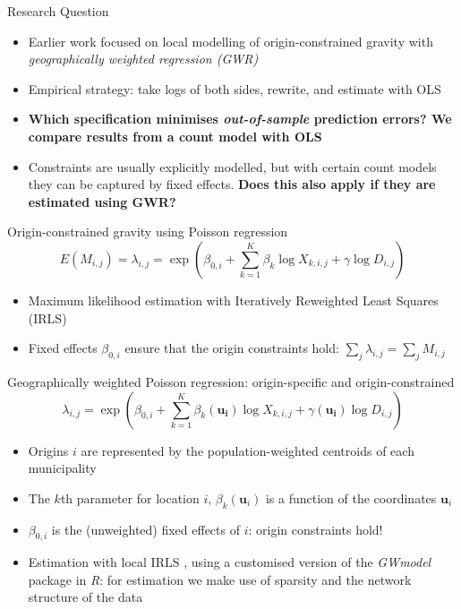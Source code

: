 \documentclass[final, 12pt, aspectratio=169, xcolor={dvipsnames}]{beamer}
\begin{document}
\begin{frame}{Research Question}
  \begin{itemize}
  \item Earlier work focused on local modelling of origin-constrained gravity with \textit{geographically weighted regression (GWR)}
  \item Empirical strategy: take logs of both sides, rewrite, and estimate with OLS 
  \item \textbf{Which specification minimises \textit{out-of-sample} prediction errors? We compare results from a count model with OLS}
  \item Constraints are usually explicitly modelled, but with certain count models they can be captured by fixed effects. \textbf{Does this also apply if they are estimated using GWR?}
  \end{itemize}
\end{frame}


\begin{frame}{Origin-constrained gravity using Poisson regression}
    $$ E(M_{i,j}) = \lambda_{i,j}  = \exp(\beta_{0, i} + \sum\limits_{k=1}^{K} \beta_{k} \log{X}_{k,i,j} + \gamma \log{D}_{i,j}) $$
  \begin{itemize}
    \item Maximum likelihood estimation with Iteratively Reweighted Least Squares (IRLS)
    \item Fixed effects $\beta_{0, i}$ ensure that the origin constraints hold: $\sum\limits_{j} \lambda_{i,j} = \sum\limits_{j} M_{i,j}$
    \end{itemize}
\end{frame}


\begin{frame}{Geographically weighted Poisson regression: origin-specific and origin-constrained}
  $$\lambda_{i,j} = \exp(\beta_{0,i} + \sum\limits_{k=1}^{K}\beta_{k}(\mathbf{u_{i}})\log{X_{k,i,j}} +  \gamma(\mathbf{u_{i}}) \log{D}_{i,j})$$
  \begin{itemize}
  \item Origins $i$ are represented by the population-weighted centroids of each municipality 
  \item The $k$th parameter for location $i$, $\beta_{k}(\mathbf{u}_{i})$ is a function of the coordinates $\mathbf{u}_{i}$
  \item $\beta_{0,i}$ is the (unweighted) fixed effects of $i$: origin constraints hold!
  \item Estimation with local IRLS \citep{nakaya2001local, nakaya2005geographically}, using a customised version of the \textit{GWmodel} package in \textit{R}: for estimation  we make use of sparsity and the network structure of the data
  \end{itemize}
\end{frame}
  
\end{document}
